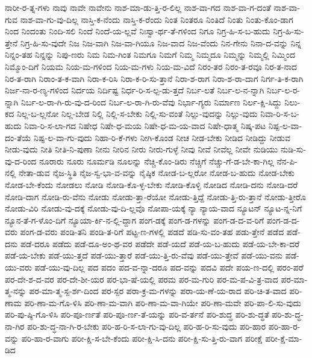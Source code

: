 {ನಾರೀ-ರ-ತ್ನ-ಗಳು
ನಾವು
ನಾವೇ
ನಾವೇನು
ನಾಶ-ಮಾ-ಡು-ತ್ತಿ-ರ-ಲಿಲ್ಲ
ನಾಶ-ವಾ-ಗದ
ನಾಶ-ವಾ-ಗ-ದಂತೆ
ನಾಶ-ವಾ-ಗುವ
ನಾಶ-ವಾ-ಗು-ವು-ದಿಲ್ಲ
ನಾಸ್ತಿ-ಕ-ನೆಂದು
ನಾಸ್ತಿ-ಕ-ರೆಂದು
ನಿಂತ
ನಿಂತರೂ
ನಿಂತಿದೆ
ನಿಂತು
ನಿಂತು-ಕೊಂ-ಡಾಗ
ನಿಂದ
ನಿಂದಂತು
ನಿಂದಿ-ಸಲಿ
ನಿಂದೆ
ನಿಂದೆ-ಯ-ಲ್ಲವೆ
ನಿಃಸ್ವಾ-ರ್ಥ-ತೆ-ಗಳಿಂದ
ನಿಗೂ
ನಿಗ್ರ-ಹಿ-ಸ-ಬ-ಹುದು
ನಿಗ್ರ-ಹಿ-ಸು-ತ್ತೇನೆ
ನಿಗ್ರ-ಹಿ-ಸು-ವುದೇ
ನಿಜ
ನಿಜ-ವಾಗಿ
ನಿಜ-ವಾ-ಗಿಯೂ
ನಿಜ-ವಾದ
ನಿಜ-ವೆಂದು
ನಿನ-ಗೇನು
ನಿನಾ-ದ-ವನ್ನು
ನಿನ್ನ
ನಿನ್ನಂ-ತಹ
ನಿನ್ನನ್ನು
ನಿಪು-ಣರು
ನಿಮ
ನಿಮ-ಗಿಂತ
ನಿಮಗೂ
ನಿಮಗೆ
ನಿಮ್ಮ
ನಿಮ್ಮದೂ
ನಿಮ್ಮನ್ನು
ನಿಮ್ಮಲ್ಲಿ
ನಿಮ್ಮಿಂದ
ನಿಮ್ಮೊಂ-ದಿಗೆ
ನಿಯಮ
ನಿಯ-ಮ-ಗಳಿಂದ
ನಿಯ-ಮ-ಗಳು
ನಿಯ-ಮ-ವಿದೆ
ನಿರಂ-ತರ
ನಿರಂ-ತ-ರವೂ
ನಿರ-ತ-ನಾದ
ನಿರ-ತ-ರಾಗಿ
ನಿರಾಂ-ತ-ಕ-ವಾಗಿ
ನಿರಾ-ಕ-ರಿಸಿ
ನಿರಾ-ಕ-ರಿ-ಸು-ತ್ತಾನೆ
ನಿರಾ-ಶ-ರಾಗ
ನಿರಾ-ಶ-ರಾ-ದಾಗ
ನಿರ್ಗ-ತಿ-ಕ-ರಾಗಿ
ನಿರ್ಜ-ನಾ-ರ-ಣ್ಯ-ಗಳಿಂದ
ನಿರ್ದಯ
ನಿರ್ದಿಷ್ಟ
ನಿರ್ಧ-ರಿ-ಸ-ಲ್ಪ-ಡು-ತ್ತದೆ
ನಿರ್ಬ-ಲತೆ
ನಿರ್ಬ-ಲ-ನ-ನ್ನಾಗಿ
ನಿರ್ಬ-ಲ-ರ-ನ್ನಾಗಿ
ನಿರ್ಬ-ಲ-ರಾ-ಗಿ-ರು-ವು-ದ-ರಿಂದ
ನಿರ್ಬ-ಲ-ರಾ-ಗಿ-ರು-ವೆವು
ನಿರ್ಭಾ-ಗ್ಯರು
ನಿರ್ಮಾಣ
ನಿರ್ಲ-ಕ್ಷಿ-ಸಿದ್ದು
ನಿಲು-ಕದ
ನಿಲ್ಲ-ಬ-ಲ್ಲನೋ
ನಿಲ್ಲ-ಬೇಡ
ನಿಲ್ಲಿ
ನಿಲ್ಲಿ-ಸ-ಬೇಕು
ನಿಲ್ಲಿ-ಸು-ವಂತೆ
ನಿಲ್ಲು-ವುದನ್ನು
ನಿಲ್ಲು-ವುದು
ನಿವಾ-ರಿ-ಸ-ಬ-ಹುದು
ನಿವಾ-ರಿ-ಸ-ಲಾ-ಗದ
ನಿಷೇಧ
ನಿಷೇ-ಧ-ಮಯ
ನಿಷೇ-ಧ-ಮ-ಯ-ವಾದ
ನಿಷೇ-ಧಾತ್ಮ
ನಿಷ್ಕ-ಪಟ
ನಿಷ್ಪ-ಲ-ವಾ-ದಂ-ತೆಯೆ
ನಿಷ್ಫ-ಲ-ವಾ-ಗು-ವುದು
ನಿಹಾ-ರಿ-ಕೆ-ಗಳು
ನೀಗಿ-ಕೊಂಡ
ನೀಚ
ನೀಡ-ಬೇಕು
ನೀಡಿದ
ನೀಡಿದ್ದು
ನೀಡುವ
ನೀಡು-ವುದು
ನೀತಿ
ನೀತಿ-ನಿ-ಪುಣಾ
ನೀನು
ನೀರಿನ
ನೀರು
ನೀರು-ಗುಳ್ಳೆ
ನೀವು
ನೀವೆ
ನೀವೆಲ್ಲ
ನೀವೇ
ನುಡಿಯು
ನುಡಿ-ಸು-ವು-ದ-ರಿಂದ
ನೂರಾರು
ನೂರು
ನೂರ್ಮಡಿ
ನೂಲನ್ನು
ನೆಚ್ಚಿ-ಕೊಂ-ಡಿರು
ನೆಚ್ಚಿಗೆ
ನೆಚ್ಚು-ಗೆ-ಡ-ಬೇ-ಕಾ-ಗಿಲ್ಲ
ನೆನ-ಪಿ-ನಲ್ಲಿ
ನೇತಾ-ಡುವ
ನೈಜ-ಸ್ಥಿತಿ
ನೈಜ-ಸ್ವ-ಭಾ-ವ-ವನ್ನು
ನೈಷ್ಠಿಕ
ನೋಡ-ಬ-ಲ್ಲರೋ
ನೋಡ-ಬ-ಹುದು
ನೋಡ-ಬೇಕು
ನೋಡ-ಬೇ-ಕೆಂದು
ನೋಡಲು
ನೋಡಿ
ನೋಡಿ-ಕೊ-ಳ್ಳ-ಬೇಕು
ನೋಡಿ-ಕೊಳ್ಳಿ
ನೋಡಿದ
ನೋಡಿ-ದನು
ನೋಡಿ-ದರೆ
ನೋಡಿ-ದಾಗ
ನೋಡಿ-ರು-ವೆನು
ನೋಡು
ನೋಡು-ತ್ತಾ-ರೆಯೋ
ನೋಡು-ತ್ತಿದ್ದೆ
ನೋಡು-ತ್ತಿ-ರು-ತ್ತಾನೆ
ನೋಡು-ತ್ತೀರೊ
ನೋಡು-ವಿರಿ
ನೋಡು-ವು-ದಕ್ಕೆ
ನೋಡು-ವು-ದಿ-ಲ್ಲವೊ
ನೋಪಾ-ಯಕ್ಕೆ
ನ್ಯಾ
ನ್ಯಾಯ-ವಾದ
ನ್ಯೂಟನ್
ನ್ಯೂಟ-ನ್ನ-ನಿಗೆ
ನ್ಯೂನ-ತೆ-ಗ-ಳೊಂ-ದಿಗೆ
ನ್ಯೂಯಾ-ರ್ಕಿ-ನ-ಲ್ಲಿ-ದ್ದಾಗ
ಪಂಗ-ಡಕ್ಕೆ
ಪಂಗ-ಡ-ಗಳನ್ನು
ಪಂಗ-ಡ-ದ-ವ-ರಿಗೆ
ಪಂಗ-ಡ-ದ-ವರು
ಪಂಗ-ಡ-ವರು
ಪಂಡಿ-ತನಿ
ಪಂಡಿ-ತ-ರಿಗೆ
ಪಟ್ಟ-ಣ-ಗಳಲ್ಲಿ
ಪಡದೆ
ಪಡಿ-ಸು-ವಂ-ತಹ
ಪಡು-ತ್ತೇನೆ
ಪಡೆದ
ಪಡೆ-ದನು
ಪಡೆ-ದರೂ
ಪಡೆದು
ಪಡೆ-ದೂ-ಅಂ-ಥ-ವರ
ಪಡೆದೇ
ಪಡೆ-ಯದೆ
ಪಡೆ-ಯ-ಬ-ಹುದು
ಪಡೆ-ಯ-ಬೇ-ಕಾ-ದರೆ
ಪಡೆ-ಯ-ಬೇಕು
ಪಡೆ-ಯು-ತ್ತದೆ
ಪಡೆ-ಯು-ತ್ತಾರೆ
ಪಡೆ-ಯು-ತ್ತಿ-ರು-ವೆವು
ಪಡೆ-ಯು-ತ್ತೇವೆ
ಪಡೆ-ಯು-ವನು
ಪಡೆ-ಯು-ವರು
ಪಡೆ-ಯು-ವು-ದಿಲ್ಲ
ಪದ
ಪದಂ
ಪದ-ವ-ನ್ನಾ-ದರೂ
ಪದ-ವನ್ನು
ಪದವಿ
ಪದೇ
ಪಯ-ಣ-ದಲ್ಲಿ
ಪರಂ-ಪರೆ
ಪರ-ದೇ-ಶ-ದ-ವರ
ಪರ-ದೇ-ಶೀ-ಯರ
ಪರ-ಭಾ-ಷೆ-ಯಲ್ಲಿ
ಪರಮ
ಪರ-ಮ-ಗುರಿ
ಪರ-ಮ-ಪ-ವಿ-ತ್ರ-ವಾದ
ಪರ-ಮಾ-ತ್ಮ-ನನ್ನು
ಪರ-ಮಾ-ತ್ಮ-ಸ್ಪ-ರ್ಶ-ದಿಂದ
ಪರ-ಸ್ಪರ
ಪರಾ-ಕ್ರ-ಮ-ಗಳನ್ನು
ಪರಾ-ಯ-ಣೆ-ಯ-ರಾದ
ಪರಿ-ಚಿ-ತ-ವಾದ
ಪರಿ-ಣಾಮ
ಪರಿ-ಣಾ-ಮ-ಗೊ-ಳಿಸಿ
ಪರಿ-ಣಾ-ಮ-ವಾಗಿ
ಪರಿ-ಣಾ-ಮ-ವಾ-ಗಿಯೇ
ಪರಿ-ಣಾ-ಮವೇ
ಪರಿ-ಪಾ-ಲಿ-ಸು-ವುದು
ಪರಿ-ಪು-ಷ್ಠಿ-ಗೊ-ಳಿಸಿ
ಪರಿ-ಪೂ-ರ್ಣತೆ
ಪರಿ-ಪೂ-ರ್ಣ-ತೆ-ಯನ್ನು
ಪರಿ-ವ-ರ್ತನೆ
ಪರಿ-ಶುದ್ಧ
ಪರಿ-ಶು-ದ್ಧತೆ
ಪರಿ-ಶು-ದ್ಧ-ನಾ-ಗಿರ
ಪರಿ-ಶು-ದ್ಧ-ನಾ-ಗಿ-ರ-ಬೇಕು
ಪರಿ-ಹ-ರಿ-ಸ-ಲಾ-ಗು-ವು-ದಿಲ್ಲ
ಪರಿ-ಹ-ರಿ-ಸು-ವುದು
ಪರಿ-ಹಾರ
ಪರಿ-ಹಾ-ರ-ವನ್ನು
ಪರಿ-ಹಾ-ರ-ವಾಗು
ಪರೀ-ಕ್ಷಿ-ಸ-ಬೇ-ಕೆಂದು
ಪರೀ-ಕ್ಷಿ-ಸಿ-ದನು
ಪರೀ-ಕ್ಷಿ-ಸು-ತ್ತಿ-ರು-ವಾಗ
ಪರೀಕ್ಷೆ
ಪರೀ-ಕ್ಷೆ-ಮಾ-ಡಿದ
}
